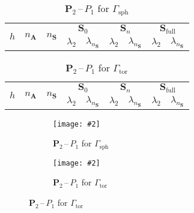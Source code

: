 \documentclass[12pt]{article}
\newcommand{\includegraphicsw}[2][1.]{\texttt{[image: \#2]}}
\newcommand{\vect}[1]{\boldsymbol{\mathbf{#1}}}
\newcommand{\sphere}{{\Gamma_{\text{sph}}}}
\newcommand{\tor}{{\Gamma_{\text{tor}}}}
\begin{document}
\clearpage

\begin{table}[h!]
	\centering
	\caption{$\vect P_2$\,--\,$P_1$ for $\sphere$} 
	\label{tab:p2p1}
	\small
	\begin{tabular}[1.3]{|c|c|c|c|c|c|c|c|c|}
		\hline
		\multirow{2}{*}{$h$} & \multirow{2}{*}{$n_{\vect A}$} & \multirow{2}{*}{$n_{\vect S}$} & \multicolumn{2}{c|}{$\vect S_0$} & \multicolumn{2}{c|}{$\vect S_n$} & \multicolumn{2}{c|}{$\vect S_{\text{full}}$} \\ 
		\cline{4-9}
		& & & $\lambda_2$ & $\lambda_{n_{\vect S}}$ & $\lambda_2$ & $\lambda_{n_{\vect S}}$ & $\lambda_2$ & $\lambda_{n_{\vect S}}$ \\ 
		\hline
		
%		
	\end{tabular}
\end{table}
\begin{table}[h!]
	\centering
	\caption{$\vect P_2$\,--\,$P_1$ for $\tor$} 
	\label{tab:p2p1_tor}
	\small
	\begin{tabular}[1.3]{|c|c|c|c|c|c|c|c|c|}
		\hline
		\multirow{2}{*}{$h$} & \multirow{2}{*}{$n_{\vect A}$} & \multirow{2}{*}{$n_{\vect S}$} & \multicolumn{2}{c|}{$\vect S_0$} & \multicolumn{2}{c|}{$\vect S_n$} & \multicolumn{2}{c|}{$\vect S_{\text{full}}$} \\ 
		\cline{4-9}
		& & & $\lambda_2$ & $\lambda_{n_{\vect S}}$ & $\lambda_2$ & $\lambda_{n_{\vect S}}$ & $\lambda_2$ & $\lambda_{n_{\vect S}}$ \\ 
		\hline
		
%		
	\end{tabular}
\end{table}
\vfill
\begin{figure}[h]
	\centering
	\begin{subfigure}{.49\linewidth}
		\centering
		\includegraphicsw{sphere_2_P2P1.png}
		\caption{$\vect P_2$\,--\,$P_1$ for $\sphere$}
	\end{subfigure}%
	\hfill
	\begin{subfigure}{.49\linewidth}
		\centering
		\includegraphicsw{torus_P2P1.png}
		\caption{$\vect P_2$\,--\,$P_1$ for $\tor$}
	\end{subfigure}	
\end{figure}
\vfill

\clearpage



\end{document}
